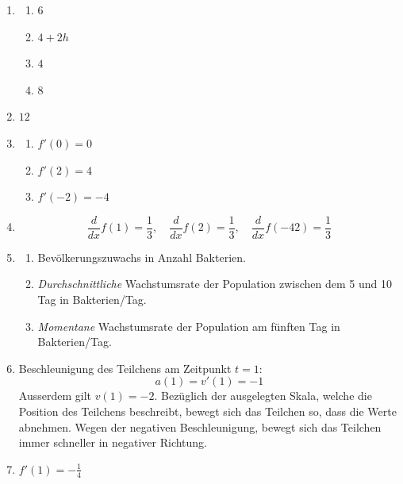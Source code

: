 \begin{enumerate}
  \item
  \begin{enumerate}
    \item \( 6 \)
    \item \( 4 + 2h \)
    \item \( 4 \)
    \item \( 8 \)
  \end{enumerate}

  \item
   \( 12 \)
  

  \item
  \begin{enumerate}
    \item \( f'(0) = 0 \)
    \item \( f'(2) = 4 \)
    \item  \( f'(-2) = -4 \)
  \end{enumerate}

  \item
  \[
  \frac{d}{dx}f(1) = \frac{1}{3}, \quad
  \frac{d}{dx}f(2) = \frac{1}{3}, \quad
  \frac{d}{dx}f(-42) = \frac{1}{3}
  \]
  \item 
        \begin{enumerate}
            \item Bevölkerungszuwachs in Anzahl Bakterien.
            \item \emph{Durchschnittliche} Wachstumsrate der Population zwischen dem 5 und 10 Tag in Bakterien/Tag.
            \item  \emph{Momentane} Wachstumsrate der Population am fünften Tag in Bakterien/Tag.
        \end{enumerate}
\item Beschleunigung des Teilchens am Zeitpunkt \( t=1 \):
\[
    a(1) = v'(1) = -1
\]
Ausserdem gilt $v(1)=-2$. Bezüglich der ausgelegten Skala, welche die Position des Teilchens beschreibt, bewegt sich das Teilchen so, dass die Werte abnehmen. Wegen der negativen Beschleunigung, bewegt sich das Teilchen immer schneller in negativer Richtung.
  \item
   \( f'(1) = -\frac{1}{4} \)
  
\end{enumerate}
























